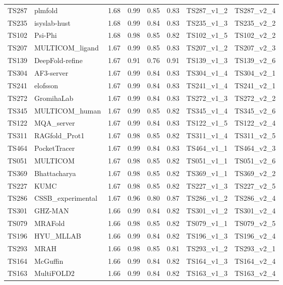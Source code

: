 \begin{longtable}{llllllll}
TS287 & plmfold & 1.68 & 0.99 & 0.85 & 0.83 & TS287\_v1\_2 & TS287\_v2\_4 \\ 
TS235 & isyslab-hust & 1.68 & 0.99 & 0.84 & 0.83 & TS235\_v1\_3 & TS235\_v2\_2 \\ 
TS102 & Psi-Phi & 1.68 & 0.98 & 0.85 & 0.82 & TS102\_v1\_5 & TS102\_v2\_2 \\ 
TS207 & MULTICOM\_ligand & 1.67 & 0.99 & 0.85 & 0.83 & TS207\_v1\_2 & TS207\_v2\_3 \\ 
TS139 & DeepFold-refine & 1.67 & 0.91 & 0.76 & 0.91 & TS139\_v1\_3 & TS139\_v2\_6 \\ 
TS304 & AF3-server & 1.67 & 0.99 & 0.84 & 0.83 & TS304\_v1\_4 & TS304\_v2\_1 \\ 
TS241 & elofsson & 1.67 & 0.99 & 0.84 & 0.83 & TS241\_v1\_4 & TS241\_v2\_1 \\ 
TS272 & GromihaLab & 1.67 & 0.99 & 0.84 & 0.83 & TS272\_v1\_3 & TS272\_v2\_2 \\ 
TS345 & MULTICOM\_human & 1.67 & 0.99 & 0.85 & 0.82 & TS345\_v1\_4 & TS345\_v2\_6 \\ 
TS122 & MQA\_server & 1.67 & 0.99 & 0.84 & 0.83 & TS122\_v1\_5 & TS122\_v2\_4 \\ 
TS311 & RAGfold\_Prot1 & 1.67 & 0.98 & 0.85 & 0.82 & TS311\_v1\_4 & TS311\_v2\_5 \\ 
TS464 & PocketTracer & 1.67 & 0.99 & 0.84 & 0.83 & TS464\_v1\_1 & TS464\_v2\_3 \\ 
TS051 & MULTICOM & 1.67 & 0.98 & 0.85 & 0.82 & TS051\_v1\_1 & TS051\_v2\_6 \\ 
TS369 & Bhattacharya & 1.67 & 0.98 & 0.85 & 0.82 & TS369\_v1\_1 & TS369\_v2\_2 \\ 
TS227 & KUMC & 1.67 & 0.98 & 0.85 & 0.82 & TS227\_v1\_3 & TS227\_v2\_5 \\ 
TS286 & CSSB\_experimental & 1.67 & 0.96 & 0.80 & 0.87 & TS286\_v1\_2 & TS286\_v2\_4 \\ 
TS301 & GHZ-MAN & 1.66 & 0.99 & 0.84 & 0.82 & TS301\_v1\_2 & TS301\_v2\_4 \\ 
TS079 & MRAFold & 1.66 & 0.98 & 0.85 & 0.82 & TS079\_v1\_1 & TS079\_v2\_5 \\ 
TS196 & HYU\_MLLAB & 1.66 & 0.99 & 0.84 & 0.82 & TS196\_v1\_3 & TS196\_v2\_4 \\ 
TS293 & MRAH & 1.66 & 0.98 & 0.85 & 0.81 & TS293\_v1\_2 & TS293\_v2\_1 \\ 
TS164 & McGuffin & 1.66 & 0.99 & 0.84 & 0.82 & TS164\_v1\_3 & TS164\_v2\_4 \\ 
TS163 & MultiFOLD2 & 1.66 & 0.99 & 0.84 & 0.82 & TS163\_v1\_3 & TS163\_v2\_4 \\ 

\end{longtable}
